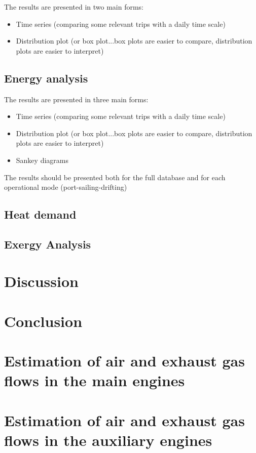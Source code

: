 \documentclass[preprint,12pt]{elsarticle}
\begin{document}
The results are presented in two main forms:
\begin{itemize}
	\item Time series (comparing some relevant trips with a daily time scale)
	\item Distribution plot (or box plot...box plots are easier to compare, distribution plots are easier to interpret)
\end{itemize}

\subsection{Energy analysis} \label{sec:res:energy}

The results are presented in three main forms:
\begin{itemize}
	\item Time series (comparing some relevant trips with a daily time scale)
	\item Distribution plot (or box plot...box plots are easier to compare, distribution plots are easier to interpret)
	\item Sankey diagrams
\end{itemize}

The results should be presented both for the full database and for each operational mode (port-sailing-drifting)

\subsection{Heat demand} \label{sec:res:heat}

\subsection{Exergy Analysis} \label{sec:res:exergy}





\section{Discussion}
\label{sec:discussion}


\section{Conclusion}
\label{sec:conclusion}

\appendix

\section{Estimation of air and exhaust gas flows in the main engines}

\section{Estimation of air and exhaust gas flows in the auxiliary engines}




\end{document}
